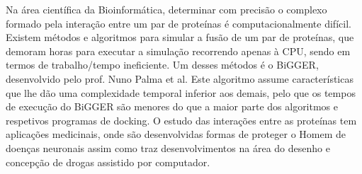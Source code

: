 


%
%
Na área científica da Bioinformática, determinar com precisão o complexo formado pela interação entre um par de proteínas é computacionalmente difícil. 
Existem métodos e algoritmos para simular a fusão de um par de proteínas, que demoram horas para executar a simulação recorrendo apenas à CPU, sendo em termos de trabalho/tempo ineficiente. 
Um desses métodos é o BiGGER, desenvolvido pelo prof. Nuno Palma et al. 
Este algoritmo assume características que lhe dão uma complexidade temporal inferior aos demais, pelo que os tempos de execução do BiGGER são menores do que a maior parte dos algoritmos e respetivos programas de docking.
O estudo das interações entre as proteínas tem aplicações medicinais, onde são desenvolvidas formas de proteger o Homem de doenças neuronais assim como traz desenvolvimentos na área do desenho e concepção de drogas assistido por computador. 

